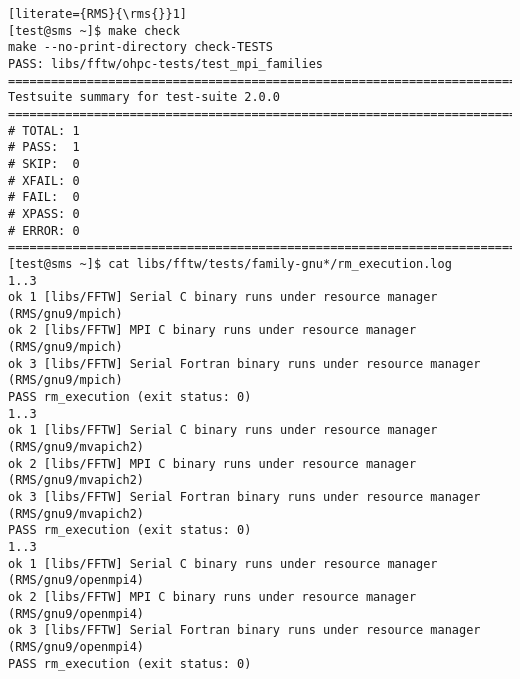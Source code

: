 \begin{lstlisting}[literate={RMS}{\rms{}}1]
[test@sms ~]$ make check
make --no-print-directory check-TESTS
PASS: libs/fftw/ohpc-tests/test_mpi_families
============================================================================
Testsuite summary for test-suite 2.0.0
============================================================================
# TOTAL: 1
# PASS:  1
# SKIP:  0
# XFAIL: 0
# FAIL:  0
# XPASS: 0
# ERROR: 0
============================================================================
[test@sms ~]$ cat libs/fftw/tests/family-gnu*/rm_execution.log 
1..3
ok 1 [libs/FFTW] Serial C binary runs under resource manager (RMS/gnu9/mpich)
ok 2 [libs/FFTW] MPI C binary runs under resource manager (RMS/gnu9/mpich)
ok 3 [libs/FFTW] Serial Fortran binary runs under resource manager (RMS/gnu9/mpich)
PASS rm_execution (exit status: 0)
1..3
ok 1 [libs/FFTW] Serial C binary runs under resource manager (RMS/gnu9/mvapich2)
ok 2 [libs/FFTW] MPI C binary runs under resource manager (RMS/gnu9/mvapich2)
ok 3 [libs/FFTW] Serial Fortran binary runs under resource manager (RMS/gnu9/mvapich2)
PASS rm_execution (exit status: 0)
1..3
ok 1 [libs/FFTW] Serial C binary runs under resource manager (RMS/gnu9/openmpi4)
ok 2 [libs/FFTW] MPI C binary runs under resource manager (RMS/gnu9/openmpi4)
ok 3 [libs/FFTW] Serial Fortran binary runs under resource manager (RMS/gnu9/openmpi4)
PASS rm_execution (exit status: 0)
\end{lstlisting}
